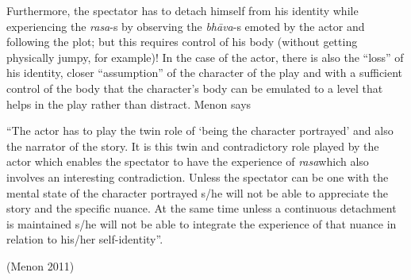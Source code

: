 Furthermore, the spectator has to detach himself from his identity while experiencing the \textsl{rasa}-s by observing the \textsl{bhāva}-s emoted by the actor and following the plot; but this requires control of his body (without getting physically jumpy, for example)! In the case of the actor, there is also the “loss” of his identity, closer “assumption” of the character of the play and with a sufficient control of the body that the character’s body can be emulated to a level that helps in the play rather than distract. Menon says 

\begin{myquote}
“The actor has to play the twin role of ‘being the character portrayed’ and also the narrator of the story. It is this twin and contradictory role played by the actor which enables the spectator to have the experience of \textsl{rasa}which also involves an interesting contradiction. Unless the spectator can be one with the mental state of the character portrayed s/he will not be able to appreciate the story and the specific nuance. At the same time unless a continuous detachment is maintained s/he will not be able to integrate the experience of that nuance in relation to his/her self-identity”. 

\hfill(Menon 2011)
\end{myquote}


